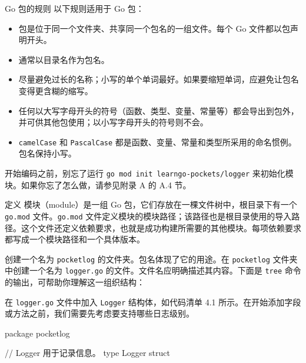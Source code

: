 \begin{infobox}{Go 包的规则}
以下规则适用于 Go 包：

\begin{itemize}
  \item 包是位于同一个文件夹、共享同一个包名的一组文件。每个 Go 文件都以包声明开头。
  \item 通常以目录名作为包名。
  \item 尽量避免过长的名称；小写的单个单词最好。如果要缩短单词，应避免让包名变得更含糊的缩写。
  \item 任何以大写字母开头的符号（函数、类型、变量、常量等）都会导出到包外，并可供其他包使用；以小写字母开头的符号则不会。
  \item \texttt{camelCase} 和 \texttt{PascalCase} 都是函数、变量、常量和类型所采用的命名惯例。包名保持小写。
\end{itemize}
\end{infobox}

开始编码之前，别忘了运行 \texttt{go mod init learngo-pockets/logger} 来初始化模块。如果你忘了怎么做，请参见附录 A 的 A.4 节。

\begin{infobox}{定义}
模块（module）是一组 Go 包，它们存放在一棵文件树中，根目录下有一个 \texttt{go.mod} 文件。\texttt{go.mod} 文件定义模块的模块路径；该路径也是根目录使用的导入路径。这个文件还定义依赖要求，也就是成功构建所需要的其他模块。每项依赖要求都写成一个模块路径和一个具体版本。
\end{infobox}

创建一个名为 \texttt{pocketlog} 的文件夹。包名体现了它的用途。在 \texttt{pocketlog} 文件夹中创建一个名为 \texttt{logger.go} 的文件。文件名应明确描述其内容。下面是 \texttt{tree} 命令的输出，可帮助你理解这一组织结构：

\begin{treebox}
\end{treebox}

在 \texttt{logger.go} 文件中加入 \texttt{Logger} 结构体，如代码清单 4.1 所示。在开始添加字段或方法之前，我们需要先考虑要支持哪些日志级别。

\begin{gocode}[title={代码清单 4.1 logger/logger.go：空的 Logger 结构体}]
package pocketlog

// Logger 用于记录信息。
type Logger struct {
}
\end{gocode}

